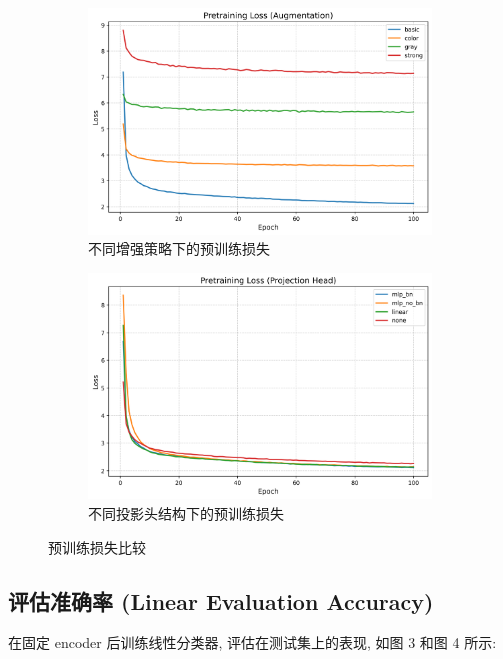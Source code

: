 \documentclass[11pt]{article}
\begin{document}
\begin{figure}[htbp]
	\centering
	\begin{subfigure}[htbp]{0.45\textwidth}
		\centering
		\includegraphics[width=\textwidth]{figure/pretrain_loss_augment.png}
		\caption{不同增强策略下的预训练损失}
	\end{subfigure}
	\hfill
	\begin{subfigure}[htbp]{0.45\textwidth}
		\centering
		\includegraphics[width=\textwidth]{figure/pretrain_loss_head.png}
		\caption{不同投影头结构下的预训练损失}
	\end{subfigure}
	\caption{预训练损失比较}
\end{figure}

\subsection{评估准确率 (Linear Evaluation Accuracy)}
在固定 encoder 后训练线性分类器, 评估在测试集上的表现, 如图 3 和图 4 所示: 
\end{document}
